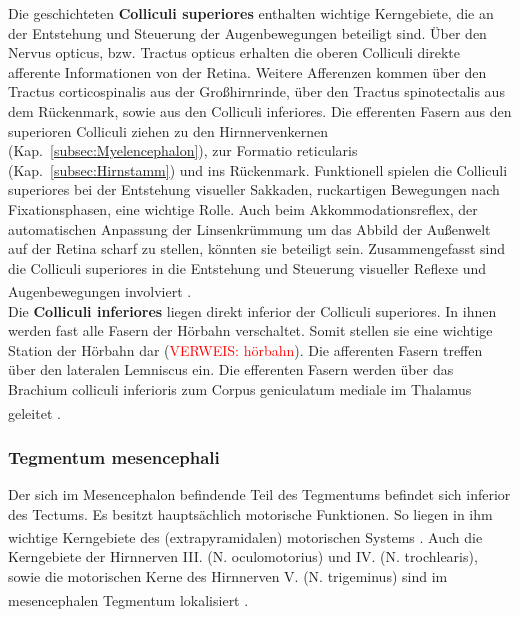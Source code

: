\documentclass[12pt,a4paper,pdftex]{article}
\begin{document}
\noindent Die geschichteten \textbf{Colliculi superiores} enthalten wichtige Kerngebiete, die an der Entstehung und Steuerung der Augenbewegungen beteiligt sind. Über den Nervus opticus, bzw. Tractus opticus erhalten die oberen Colliculi direkte afferente Informationen von der Retina. Weitere Afferenzen kommen über den Tractus corticospinalis aus der Großhirnrinde, über den Tractus spinotectalis aus dem Rückenmark, sowie aus den Colliculi inferiores. Die efferenten Fasern aus den superioren Colliculi ziehen zu den Hirnnervenkernen (Kap.~\ref{subsec:Myelencephalon}), zur Formatio reticularis (Kap.~\ref{subsec:Hirnstamm}) und ins Rückenmark. Funktionell spielen die Colliculi superiores bei der Entstehung visueller Sakkaden, ruckartigen Bewegungen nach Fixationsphasen, eine wichtige Rolle. Auch beim  Akkommodationsreflex, der automatischen Anpassung der Linsenkrümmung um das Abbild der Außenwelt auf der Retina scharf zu stellen, könnten sie beteiligt sein. Zusammengefasst sind die Colliculi superiores in die Entstehung und Steuerung visueller Reflexe und Augenbewegungen involviert \textsuperscript{\cite[6]{trepel2011neuroanatomie}}.\\

\noindent Die \textbf{Colliculi inferiores} liegen direkt inferior der Colliculi superiores. In ihnen werden fast alle Fasern der Hörbahn verschaltet. Somit stellen sie eine wichtige Station der Hörbahn dar (\textcolor{red}{VERWEIS: hörbahn}). Die afferenten Fasern treffen über den lateralen Lemniscus ein. Die efferenten Fasern werden über das Brachium colliculi inferioris zum Corpus geniculatum mediale im Thalamus geleitet \textsuperscript{\cite[6]{trepel2011neuroanatomie}}.


\subsubsection{Tegmentum mesencephali}

Der sich im Mesencephalon befindende Teil des Tegmentums befindet sich inferior des Tectums. Es besitzt hauptsächlich motorische Funktionen. So liegen in ihm wichtige Kerngebiete des (extrapyramidalen) motorischen Systems \textsuperscript{\cite[14]{penzlin2005tierphys}}.
Auch die Kerngebiete der Hirnnerven III. (N. oculomotorius) und IV. (N. trochlearis), sowie die motorischen Kerne des Hirnnerven V. (N. trigeminus) sind im mesencephalen Tegmentum lokalisiert \textsuperscript{\cite[6]{trepel2011neuroanatomie}}.\\
\end{document}
